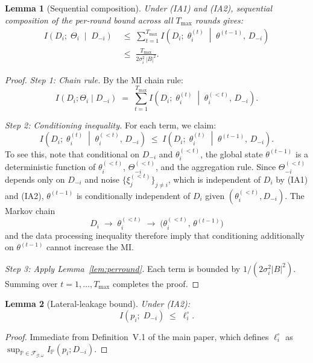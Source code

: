 \documentclass[letterpaper,journal]{IEEEtran}
\newtheorem{lemma}{Lemma}[section]
\newcommand{\FAM}{\mathcal{F}}
\newcommand{\TOPO}{\mathcal{G}}
\newcommand{\Tmax}{T_{\max}}
\begin{document}
\begin{lemma}[Sequential composition]
\label{lem:composition}
Under (IA1) and (IA2), sequential composition of the per-round
bound across all $\Tmax$ rounds gives:
\begin{align*}
I\!\left(D_i;\;\Theta_i \;\middle|\; D_{-i}\right)
&\;\leq\;
\sum_{t=1}^{\Tmax}
I\!\left(D_i;\;\theta_i^{(t)} \;\middle|\;
\theta^{(t-1)},\,D_{-i}\right) \\
&\;\leq\;
\frac{\Tmax}{2\sigma_i^2\,|B|^2}.
\end{align*}
\end{lemma}

\begin{proof}
\textit{Step 1: Chain rule.} By the MI chain rule:
\[
I(D_i;\Theta_i \mid D_{-i})
\;=\; \sum_{t=1}^{\Tmax}
I\!\left(D_i;\;\theta_i^{(t)} \;\middle|\;
\theta_i^{(<t)},\,D_{-i}\right).
\]

\noindent\textit{Step 2: Conditioning inequality.}
For each term, we claim:
\[
I\!\left(D_i;\;\theta_i^{(t)} \;\middle|\;
\theta_i^{(<t)},\,D_{-i}\right)
\;\leq\;
I\!\left(D_i;\;\theta_i^{(t)} \;\middle|\;
\theta^{(t-1)},\,D_{-i}\right).
\]
To see this, note that conditional on $D_{-i}$ and
$\theta_i^{(<t)}$, the global state $\theta^{(t-1)}$ is a
deterministic function of $\theta_i^{(<t)}$,
$\Theta_{-i}^{(<t)}$, and the aggregation rule. Since
$\Theta_{-i}^{(<t)}$ depends only on $D_{-i}$ and noise
$\{\xi_j^{(<t)}\}_{j \neq i}$, which is independent of $D_i$
by (IA1) and (IA2), $\theta^{(t-1)}$ is conditionally
independent of $D_i$ given $(\theta_i^{(<t)}, D_{-i})$.
The Markov chain
\[
D_i \;\longrightarrow\; \theta_i^{(<t)}
\;\longrightarrow\;
\bigl(\theta_i^{(<t)},\,\theta^{(t-1)}\bigr)
\]
and the data processing inequality therefore imply that
conditioning additionally on $\theta^{(t-1)}$ cannot increase
the MI.

\medskip
\noindent\textit{Step 3: Apply Lemma~\ref{lem:perround}.}
Each term is bounded by $1/(2\sigma_i^2|B|^2)$. Summing
over $t = 1, \ldots, \Tmax$ completes the proof.
\end{proof}

\begin{lemma}[Lateral-leakage bound]
\label{lem:lateral}
Under (IA2):
\[
I\!\left(p_i;\;D_{-i}\right) \;\leq\; \ell_i^\circ.
\]
\end{lemma}

\begin{proof}
Immediate from Definition~V.1 of the main paper, which defines
$\ell_i^\circ$ as $\sup_{\mathbb{P} \in \FAM_{\TOPO,\omega}}
I_{\mathbb{P}}(p_i; D_{-i})$.
\end{proof}
\end{document}

